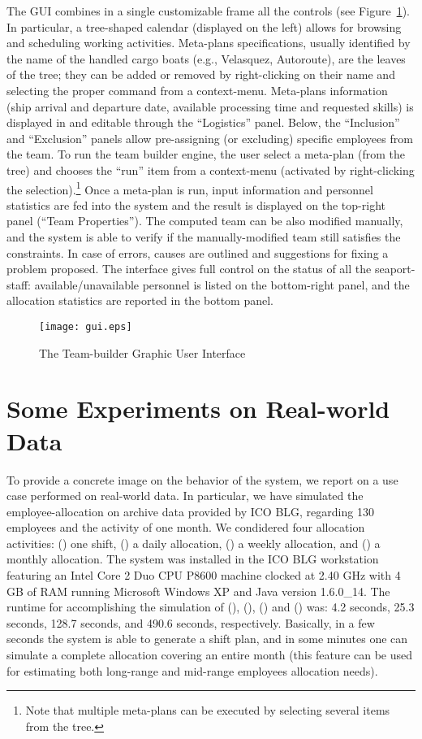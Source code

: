 \documentclass{tlp}
\begin{document}
The GUI combines in a single customizable
frame all the  controls  (see Figure~\ref{fig:gui}). In particular,
a tree-shaped calendar (displayed on the left)
allows for browsing and scheduling working activities.
Meta-plans specifications, usually identified by the name of the
handled cargo boats (e.g., Velasquez, Autoroute),
are the leaves of the tree; they can be added or removed by right-clicking on their name
and selecting the proper command from a context-menu.
Meta-plans information (ship arrival and departure date, available processing time
and requested skills) is displayed in and editable through the ``Logistics'' panel.
Below, the ``Inclusion'' and ``Exclusion'' panels allow pre-assigning (or excluding)
specific employees from the team.
To run the team builder engine,
the user select a meta-plan (from the tree) and chooses the ``run''
item from a context-menu (activated by right-clicking the selection).\footnote{Note that multiple meta-plans can be executed by selecting several items from the tree.}
Once a meta-plan is run, input information and personnel statistics are fed into the \dlv system
and the result is displayed on the top-right panel (``Team Properties'').
The computed team can be also modified manually, and
the system is able to verify if the manually-modified team still satisfies
the constraints. In case of errors, causes are outlined and
suggestions for fixing a problem proposed.
The interface gives full control on the status of all the seaport-staff:
available/unavailable personnel is listed on the bottom-right panel,
and the allocation statistics are reported in the bottom panel.

\begin{figure}[t!]
\centering
\texttt{[image: gui.eps]}
\vspace{0.5cm}
\caption{ The Team-builder Graphic User Interface}\label{fig:gui}
\end{figure}


\section{Some Experiments on Real-world Data}\label{sec:exp}

To provide a concrete image on the behavior of the system, we report on
a use case performed on real-world data.
In particular, we have simulated the employee-allocation on archive data provided by ICO BLG,
regarding 130 employees  and the activity of one month. We condidered four allocation activities:
() one shift,
() a daily allocation,
() a weekly allocation, and
() a monthly allocation.
The system was installed in the ICO BLG workstation featuring an
Intel Core 2 Duo CPU P8600 machine clocked at 2.40 GHz
with 4 GB of RAM running Microsoft Windows XP and Java version 1.6.0\_14.
The runtime for accomplishing the simulation of (), (), () and () was:
4.2 seconds, 25.3 seconds, 128.7 seconds, and 490.6 seconds, respectively.
Basically, in a few seconds the system is able to generate a shift plan,
and in some minutes one can simulate a complete allocation covering an entire month
(this feature can be used for estimating both long-range and mid-range
employees allocation needs).
\end{document}

